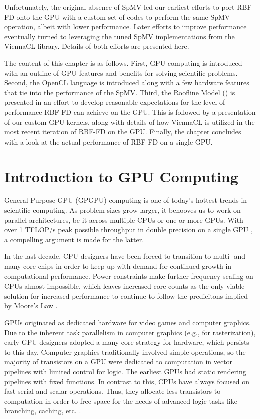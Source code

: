 \documentclass{report}
\begin{document}
Unfortunately, the original absence of SpMV led our earliest efforts to port RBF-FD onto the GPU with a custom set of codes to perform the same SpMV operation, albeit with lower performance. Later efforts to improve performance eventually turned to leveraging the tuned SpMV implementations from the ViennaCL library. Details of both efforts are presented here. 

The content of this chapter is as follows. First, GPU computing is introduced with an outline of GPU features and benefits for solving scientific problems. Second, the OpenCL language is introduced along with a few hardware features that tie into the performance of the SpMV. Third, the Roofline Model (\cite{Williams2009}) is presented in an effort to develop reasonable  expectations for the level of performance RBF-FD can achieve on the GPU. This is followed by a presentation of our custom GPU kernels, along with details of how ViennaCL is utilized in the most recent iteration of RBF-FD on the GPU. Finally, the chapter concludes with a look at the actual performance of RBF-FD on a single GPU. 

\section{Introduction to GPU Computing} 

General Purpose GPU (GPGPU) computing is one of today's hottest trends in scientific computing. As problem sizes grow larger, it behooves us to work on parallel architectures, be it across multiple CPUs or one or more GPUs. With over 1 TFLOP/s peak possible throughput in double precision on a single GPU \cite{KeplerFactSheet}, a compelling argument is made for the latter. 

In the last decade, CPU designers have been forced to transition to multi- and many-core chips in order to keep up with demand for continued growth in computational performance. Power constraints make further frequency scaling on CPUs almost impossible, which leaves increased core counts as the only viable solution for increased performance to continue to follow the predicitons implied by Moore's Law \cite{Owens2007}. 


GPUs originated as dedicated hardware for video games and computer graphics. 
Due to the inherent task parallelism in computer graphics  (e.g., for rasterization), early GPU designers adopted a many-core strategy for hardware, which persists to this day. Computer graphics traditionally involved simple operations, so the majority of transistors on a GPU were dedicated to computation in vector pipelines with limited control for logic. The earliest GPUs had static rendering pipelines with fixed functions. In contrast to this, CPUs have always focused on fast serial and scalar operations. Thus, they allocate less transistors to computation in order to free space for the needs of advanced logic tasks like branching, caching, etc. \cite{Owens2007,CudaGuide2013}. %
\end{document}
